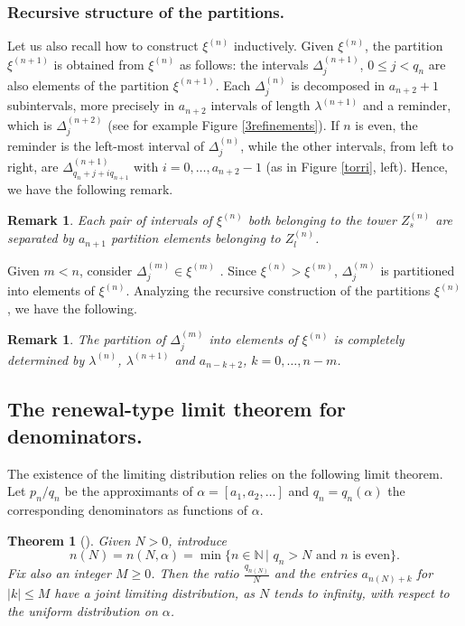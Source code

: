 \documentclass{conm-p-l}
\numberwithin{equation}{section}
\newtheorem{thm}{Theorem}
\newtheorem{rem}[theorem]{Remark}
\begin{document}
\subsubsection{Recursive structure of the partitions.}
Let us also recall how to construct $\xi^{(n)}$ inductively. Given
$\xi^{(n)}$, the partition  $\xi^{(n+1)}$ is obtained from
$\xi^{(n)}$ as follows: the intervals $\Delta^{(n+1)}_j$, $0\leq j
< q_{n}$ are also elements of the partition $\xi^{(n+1)}$. Each
$\Delta^{(n)}_j$ is decomposed in $a_{n+2}+1$ subintervals, more
precisely in $a_{n+2}$ intervals of length $\lambda^{(n+1)}$ and
a reminder, which is $\Delta^{(n+2)}_j$ (see for example Figure \ref{3refinements}). If $n$ is even, the
reminder is the left-most interval of $\Delta^{(n)}_j$, while the
other intervals, from left to right, are   $\Delta^{(n+1)}_{q_n+ j+ i
q_{n+1}}$ with $i= 0, \dots, a_{n+2}-1$ (as in Figure \ref{torri}, left). Hence, we have the following remark. 
\begin{rem}\label{separation}
Each pair of intervals of  $\xi^{(n)}$ both belonging to the tower $Z^{(n)}_{s}$ are separated by $a_{n+1}$ partition elements belonging to $Z^{(n)}_{l}$.
\end{rem}

Given $m< n$, consider  $\Delta^{(m)}_j \in   \xi^{(m)}$ . Since  $\xi^{(n)}>
\xi^{(m)}$, $\Delta^{(m)}_j$ is partitioned into elements of $\xi^{(n)}$.
Analyzing the recursive construction of the partitions
$\xi^{(n)}$, we have the following.
\begin{rem}\label{recursivepartitions}
The partition of $\Delta^{(m)}_j$ into elements of  $\xi^{(n)}$ is completely
determined by $\lambda^{(n)}$,  $\lambda^{(n+1)}$ and $a_{n-k+2}$, $k= 0, \dots,
n-m$.
\end{rem}

\subsection{The renewal-type limit theorem for denominators.}\label{renewalsec}
The existence of the limiting distribution relies on the following limit
theorem. Let  $p_n/q_n$ be the approximants of   $\alpha  = [a_1, a_2, \dots]$ and
$q_n=q_n(\alpha)$ the corresponding denominators as functions of $\alpha$.
\begin{thm}[\cite{SU:ren}]\label{main}
Given $N>0$, introduce 
\begin{equation} \label{n(N)def} n(N) = n(N,\alpha) = \min \{ n \in
\mathbb{N} \, |  \, \,  q_n > N \,\, \mathrm{and } \,\,  n \, \,
\mathrm{is} \,\,\mathrm{even}  \} . \end{equation} Fix also an integer
$M\geq0$. Then the ratio $\frac{q_{n(N)}}{N}$ and the entries
$a_{n(N)+k}$ for $| k | \leq  M$
 have a joint limiting distribution, as $N$ tends to infinity, with respect to the uniform distribution on $\alpha$. 
\end{thm}
\end{document}
